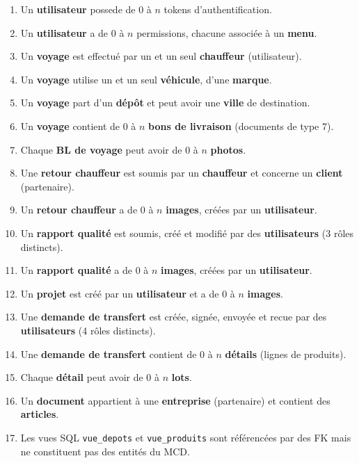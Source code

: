 \documentclass[12pt,a4paper]{article}
\begin{document}
\begin{enumerate}[leftmargin=1.5em]
\item Un \textbf{utilisateur} possede de 0 à $n$ tokens d'authentification.
\item Un \textbf{utilisateur} a de 0 à $n$ permissions, chacune associée à un \textbf{menu}.
\item Un \textbf{voyage} est effectué par un et un seul \textbf{chauffeur} (utilisateur).
\item Un \textbf{voyage} utilise un et un seul \textbf{véhicule}, d'une \textbf{marque}.
\item Un \textbf{voyage} part d'un \textbf{dépôt} et peut avoir une \textbf{ville} de destination.
\item Un \textbf{voyage} contient de 0 à $n$ \textbf{bons de livraison} (documents de type 7).
\item Chaque \textbf{BL de voyage} peut avoir de 0 à $n$ \textbf{photos}.
\item Une \textbf{retour chauffeur} est soumis par un \textbf{chauffeur} et concerne un \textbf{client} (partenaire).
\item Un \textbf{retour chauffeur} a de 0 à $n$ \textbf{images}, créées par un \textbf{utilisateur}.
\item Un \textbf{rapport qualité} est soumis, créé et modifié par des \textbf{utilisateurs} (3 rôles distincts).
\item Un \textbf{rapport qualité} a de 0 à $n$ \textbf{images}, créées par un \textbf{utilisateur}.
\item Un \textbf{projet} est créé par un \textbf{utilisateur} et a de 0 à $n$ \textbf{images}.
\item Une \textbf{demande de transfert} est créée, signée, envoyée et recue par des \textbf{utilisateurs} (4 rôles distincts).
\item Une \textbf{demande de transfert} contient de 0 à $n$ \textbf{détails} (lignes de produits).
\item Chaque \textbf{détail} peut avoir de 0 à $n$ \textbf{lots}.
\item Un \textbf{document} appartient à une \textbf{entreprise} (partenaire) et contient des \textbf{articles}.
\item Les vues SQL \texttt{vue\_depots} et \texttt{vue\_produits} sont référencées par des FK mais ne constituent pas des entités du MCD.
\end{enumerate}
\end{document}
